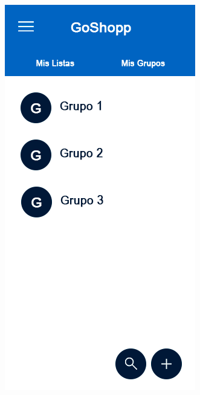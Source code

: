 \documentclass{article}
\begin{document}
\begin{figure}[htbp]
    \vspace{1cm}
    
    \begin{subfigure}[h]{0.3\textwidth}
        \includegraphics[width=\textwidth]{imagenes/modelos/grupos.png}

\end{subfigure}
\end{figure}
\end{document}
